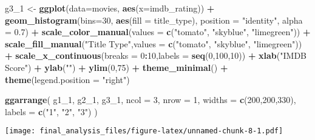 \documentclass[]{article}
\newenvironment{Shaded}{\begin{snugshade}}{\end{snugshade}}
\newcommand{\KeywordTok}[1]{\textcolor[rgb]{0.13,0.29,0.53}{\textbf{#1}}}
\newcommand{\DataTypeTok}[1]{\textcolor[rgb]{0.13,0.29,0.53}{#1}}
\newcommand{\DecValTok}[1]{\textcolor[rgb]{0.00,0.00,0.81}{#1}}
\newcommand{\FloatTok}[1]{\textcolor[rgb]{0.00,0.00,0.81}{#1}}
\newcommand{\StringTok}[1]{\textcolor[rgb]{0.31,0.60,0.02}{#1}}
\newcommand{\OperatorTok}[1]{\textcolor[rgb]{0.81,0.36,0.00}{\textbf{#1}}}
\newcommand{\NormalTok}[1]{#1}
\begin{document}
\begin{Shaded}
\begin{Highlighting}[]
\NormalTok{g3_}\DecValTok{1}\NormalTok{ <-}\StringTok{ }\KeywordTok{ggplot}\NormalTok{(}\DataTypeTok{data=}\NormalTok{movies, }\KeywordTok{aes}\NormalTok{(}\DataTypeTok{x=}\NormalTok{imdb_rating)) }\OperatorTok{+}
\StringTok{  }\KeywordTok{geom_histogram}\NormalTok{(}\DataTypeTok{bins=}\DecValTok{30}\NormalTok{, }\KeywordTok{aes}\NormalTok{(}\DataTypeTok{fill =}\NormalTok{ title_type), }\DataTypeTok{position =} \StringTok{"identity"}\NormalTok{, }\DataTypeTok{alpha =} \FloatTok{0.7}\NormalTok{) }\OperatorTok{+}\StringTok{ }
\StringTok{  }\KeywordTok{scale_color_manual}\NormalTok{(}\DataTypeTok{values =} \KeywordTok{c}\NormalTok{(}\StringTok{"tomato"}\NormalTok{, }\StringTok{"skyblue"}\NormalTok{, }\StringTok{"limegreen"}\NormalTok{)) }\OperatorTok{+}
\StringTok{  }\KeywordTok{scale_fill_manual}\NormalTok{(}\StringTok{"Title Type"}\NormalTok{,}\DataTypeTok{values =} \KeywordTok{c}\NormalTok{(}\StringTok{"tomato"}\NormalTok{, }\StringTok{"skyblue"}\NormalTok{, }\StringTok{"limegreen"}\NormalTok{)) }\OperatorTok{+}
\StringTok{  }\KeywordTok{scale_x_continuous}\NormalTok{(}\DataTypeTok{breaks =} \DecValTok{0}\OperatorTok{:}\DecValTok{10}\NormalTok{,}\DataTypeTok{labels =} \KeywordTok{seq}\NormalTok{(}\DecValTok{0}\NormalTok{,}\DecValTok{100}\NormalTok{,}\DecValTok{10}\NormalTok{)) }\OperatorTok{+}\StringTok{ }
\StringTok{  }\KeywordTok{xlab}\NormalTok{(}\StringTok{"IMDB Score"}\NormalTok{) }\OperatorTok{+}
\StringTok{  }\KeywordTok{ylab}\NormalTok{(}\StringTok{""}\NormalTok{) }\OperatorTok{+}
\StringTok{  }\KeywordTok{ylim}\NormalTok{(}\DecValTok{0}\NormalTok{,}\DecValTok{75}\NormalTok{) }\OperatorTok{+}
\StringTok{  }\KeywordTok{theme_minimal}\NormalTok{() }\OperatorTok{+}
\StringTok{  }\KeywordTok{theme}\NormalTok{(}\DataTypeTok{legend.position =} \StringTok{"right"}\NormalTok{)}


\KeywordTok{ggarrange}\NormalTok{(}
\NormalTok{    g1_}\DecValTok{1}\NormalTok{,}
\NormalTok{    g2_}\DecValTok{1}\NormalTok{,}
\NormalTok{    g3_}\DecValTok{1}\NormalTok{,}
    \DataTypeTok{ncol =} \DecValTok{3}\NormalTok{,}
    \DataTypeTok{nrow =} \DecValTok{1}\NormalTok{,}
    \DataTypeTok{widths =} \KeywordTok{c}\NormalTok{(}\DecValTok{200}\NormalTok{,}\DecValTok{200}\NormalTok{,}\DecValTok{330}\NormalTok{),}
    \DataTypeTok{labels =} \KeywordTok{c}\NormalTok{(}\StringTok{"1"}\NormalTok{, }\StringTok{"2"}\NormalTok{, }\StringTok{"3"}\NormalTok{)}
\NormalTok{  )}
\end{Highlighting}
\end{Shaded}

\texttt{[image: final\_analysis\_files/figure-latex/unnamed-chunk-8-1.pdf]}
\end{document}
